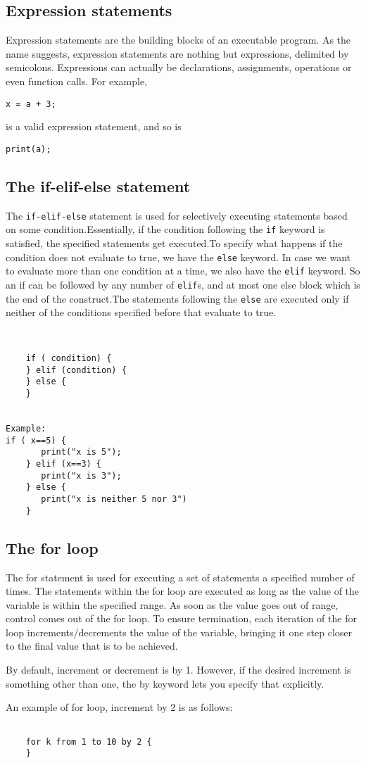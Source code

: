 

\subsection{Expression statements}

Expression statements are the building blocks of an executable program. As the name suggests, expression statements are nothing but expressions, delimited by semicolons. 
Expressions can actually be declarations, assignments, operations or even function calls.
For example,
\begin{verbatim}
x = a + 3;
\end{verbatim}
is a valid expression statement, and so is 
\begin{verbatim}
print(a);
\end{verbatim}

\subsection{The if-elif-else statement}
The \texttt{if-elif-else} statement is used for selectively executing statements based on some condition.Essentially, if the condition following the \texttt{if} keyword is satisfied, the specified statements get executed.To specify what happens if the condition does not evaluate to true, we have the \texttt{else} keyword.
In case we want to evaluate more than one condition at a time, we also have the \texttt{elif} keyword. So an if can be followed by any number of \texttt{elif}s, and at most one else block which is the end of the construct.The statements following the \texttt{else} are executed only if neither of the conditions specified before that evaluate to true.


\begin{verbatim}


	if ( condition) {
	} elif (condition) {
	} else {
	}


Example:
if ( x==5) {
       print("x is 5");
	} elif (x==3) {
	   print("x is 3");
	} else {
	   print("x is neither 5 nor 3")
	}
\end{verbatim}

\subsection{The for loop}

The for statement is used for executing a set of statements a specified number of times.	The statements within the for loop are executed as long as the value of the variable is within the specified range. 
As soon as the value goes out of range, control comes out of the for loop. To ensure termination, each iteration of the for loop increments/decrements the value of the variable, bringing it one step closer to the final value that is to be achieved.

By default, increment or decrement is by 1. However, if the desired increment is something other than one, the by keyword lets you specify that explicitly.

An example of for loop, increment by 2 is as follows: 

\begin{verbatim}

	for k from 1 to 10 by 2 {
	}
\end{verbatim}




  